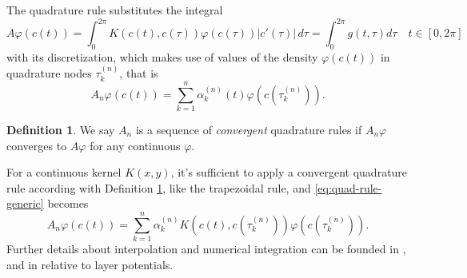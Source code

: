 \documentclass[10pt, a4paper, twoside, openright]{book}
\theoremstyle{definition}
\newtheorem{definition}[subsection]{Definition}
\theoremstyle{plain}
\theoremstyle{plain}
\theoremstyle{plain}
\theoremstyle{plain}
\theoremstyle{plain}
\theoremstyle{plain}
\theoremstyle{plain}
\theoremstyle{plain}
\let\phi\varphi
\begin{document}
The quadrature rule substitutes the integral
\begin{equation}
 A\phi(c(t))=\int_0^{2\pi} K(c(t),c(\tau))\phi(c(\tau))|c'(\tau)|\,d\tau=\int_0^{2\pi}g(t,\tau)d\tau \quad t\in[0,2\pi]
\end{equation}
with its discretization, which makes use of values of the density $\phi(c(t))$ in quadrature 
nodes $\tau_k^{(n)}$, that is
\begin{equation}
\label{eq:quad-rule-generic}
 A_n\phi(c(t)) = \sum_{k=1}^n\alpha_k^{(n)}(t)\phi(c(\tau_k^{(n)})).
\end{equation}
\begin{definition}
\label{def:convergent-quadrature-rule}
We say $A_n$ is a sequence of \emph{convergent} quadrature rules if $A_n\phi$ converges to $A\phi$ for any continuous $\phi$.
\end{definition}
For a continuous kernel $K(x,y)$, it's sufficient to apply a convergent quadrature rule according with Definition 
\ref{def:convergent-quadrature-rule}, like the trapezoidal rule, 
and \eqref{eq:quad-rule-generic} becomes
\begin{equation}
\label{eq:quad-rule-continuous}
 A_n\phi(c(t)) = \sum_{k=1}^n\alpha_k^{(n)}K(c(t),c(\tau_k^{(n)}))\phi(c(\tau_k^{(n)})).
\end{equation}
Further details about interpolation and numerical integration can be founded in \cite{QSS:book}, and in 
\cite{kress:book} relative to layer potentials.
\end{document}

